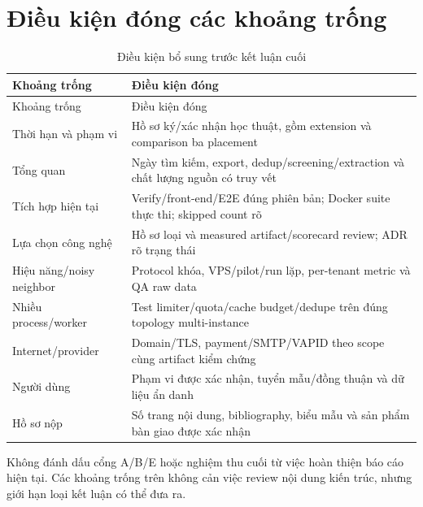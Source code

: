 \section{Điều kiện đóng các khoảng trống}
\begin{longtable}{@{}P{.30\textwidth}P{.60\textwidth}@{}}
\caption{Điều kiện bổ sung trước kết luận cuối}\label{tab:gaps}\\
\toprule Khoảng trống & Điều kiện đóng \\
\midrule\endfirsthead
\toprule Khoảng trống & Điều kiện đóng \\
\midrule\endhead
Thời hạn và phạm vi & Hồ sơ ký\slash xác nhận học thuật, gồm extension và comparison ba placement \\
Tổng quan & Ngày tìm kiếm, export, dedup\slash screening\slash extraction và chất lượng nguồn có truy vết \\
Tích hợp hiện tại & Verify\slash front-end\slash E2E đúng phiên bản; Docker suite thực thi; skipped count rõ \\
Lựa chọn công nghệ & Hồ sơ loại và measured artifact\slash scorecard review; ADR rõ trạng thái \\
Hiệu năng\slash noisy neighbor & Protocol khóa, VPS\slash pilot\slash run lặp, per-tenant metric và QA raw data \\
Nhiều process\slash worker & Test limiter\slash quota\slash cache budget\slash dedupe trên đúng topology multi-instance \\
Internet\slash provider & Domain\slash TLS, payment\slash SMTP\slash VAPID theo scope cùng artifact kiểm chứng \\
Người dùng & Phạm vi được xác nhận, tuyển mẫu\slash đồng thuận và dữ liệu ẩn danh \\
Hồ sơ nộp & Số trang nội dung, bibliography, biểu mẫu và sản phẩm bàn giao được xác nhận \\
\bottomrule\end{longtable}
Không đánh dấu cổng A\slash B\slash E hoặc nghiệm thu cuối từ việc hoàn thiện báo cáo hiện tại. Các khoảng trống trên không cản việc review nội dung kiến trúc, nhưng giới hạn loại kết luận có thể đưa ra.
